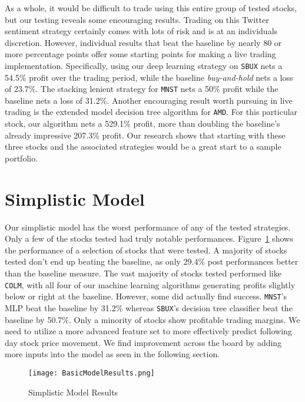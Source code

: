\documentclass[../thesis.tex]{subfiles}
\begin{document}
As a whole, it would be difficult to trade using this entire group of tested stocks, but our testing reveals some encouraging results. Trading on this Twitter sentiment strategy certainly comes with lots of risk and is at an individuals discretion. However, individual results that beat the baseline by nearly 80 or more percentage points offer some starting points for making a live trading implementation. Specifically, using our deep learning strategy on \texttt{SBUX} nets a 54.5\% profit over the trading period, while the baseline \textit{buy-and-hold} nets a loss of 23.7\%. The stacking lenient strategy for \texttt{MNST} nets a 50\% profit while the baseline nets a loss of 31.2\%. Another encouraging result worth pursuing in live trading is the extended model decision tree algorithm for \texttt{AMD}. For this particular stock, our algorithm nets a 529.1\% profit, more than doubling the baseline's already impressive 207.3\% profit. Our research shows that starting with these three stocks and the associated strategies would be a great start to a sample portfolio.

\section{Simplistic Model}
Our simplistic model has the worst performance of any of the tested strategies. Only a few of the stocks tested had truly notable performances. Figure~\ref{simpleresults} shows the performance of a selection of stocks that were tested. A majority of stocks tested don't end up beating the baseline, as only 29.4\% post performances better than the baseline measure. The vast majority of stocks tested performed like \texttt{COLM}, with all four of our machine learning algorithms generating profits slightly below or right at the baseline. However, some did actually find success. \texttt{MNST}'s MLP beat the baseline by 31.2\% whereas \texttt{SBUX}'s decision tree classifier beat the baseline by 50.7\%. Only a minority of stocks show profitable trading margins. We need to utilize a more advanced feature set to more effectively predict following day stock price movement. We find improvement across the board by adding more inputs into the model as seen in the following section. 

\begin{figure}[h]
\centering
\texttt{[image: BasicModelResults.png]}
\caption{Simplistic Model Results \label{overflow}}
\label{simpleresults}
\end{figure}
\end{document}
